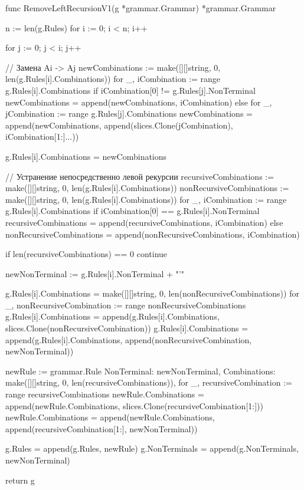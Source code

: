 func RemoveLeftRecursionV1(g *grammar.Grammar) *grammar.Grammar {
	n := len(g.Rules)
	for i := 0; i < n; i++ {
		for j := 0; j < i; j++ {
			// Замена Ai -> Aj
			newCombinations := make([][]string, 0, len(g.Rules[i].Combinations))
			for _, iCombination := range g.Rules[i].Combinations {
				if iCombination[0] != g.Rules[j].NonTerminal {
					newCombinations = append(newCombinations, iCombination)
				} else {
					for _, jCombination := range g.Rules[j].Combinations {
						newCombinations = append(newCombinations, append(slices.Clone(jCombination), iCombination[1:]...))
					}
				}
			}

			g.Rules[i].Combinations = newCombinations
		}

		// Устранение непосредственно левой рекурсии
		recursiveCombinations := make([][]string, 0, len(g.Rules[i].Combinations))
		nonRecursiveCombinations := make([][]string, 0, len(g.Rules[i].Combinations))
		for _, iCombination := range g.Rules[i].Combinations {
			if iCombination[0] == g.Rules[i].NonTerminal {
				recursiveCombinations = append(recursiveCombinations, iCombination)
			} else {
				nonRecursiveCombinations = append(nonRecursiveCombinations, iCombination)
			}
		}

		if len(recursiveCombinations) == 0 {
			continue
		}

		newNonTerminal := g.Rules[i].NonTerminal + "'"

		g.Rules[i].Combinations = make([][]string, 0, len(nonRecursiveCombinations))
		for _, nonRecursiveCombination := range nonRecursiveCombinations {
			g.Rules[i].Combinations = append(g.Rules[i].Combinations, slices.Clone(nonRecursiveCombination))
			g.Rules[i].Combinations = append(g.Rules[i].Combinations, append(nonRecursiveCombination, newNonTerminal))
		}

		newRule := grammar.Rule{
			NonTerminal:  newNonTerminal,
			Combinations: make([][]string, 0, len(recursiveCombinations)),
		}
		for _, recursiveCombination := range recursiveCombinations {
			newRule.Combinations = append(newRule.Combinations, slices.Clone(recursiveCombination[1:]))
			newRule.Combinations = append(newRule.Combinations, append(recursiveCombination[1:], newNonTerminal))
		}

		g.Rules = append(g.Rules, newRule)
		g.NonTerminals = append(g.NonTerminals, newNonTerminal)
	}

	return g
}
